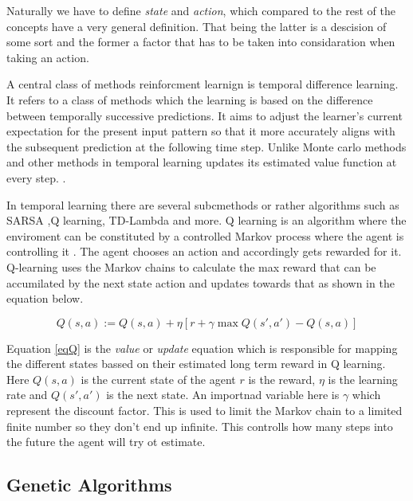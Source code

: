 Naturally we have to define \textit{state} and \textit{action}, which compared to the rest of the concepts have a very general definition. That being the latter is a descision of some sort and the former a factor that has to be taken into considaration when taking an action. 

A central class of methods reinforcment learnign is temporal difference learning. It refers to a class of methods which the learning is based on the difference between temporally successive predictions. It aims to adjust the learner's current expectation for the present input pattern so that it more accurately aligns with the subsequent prediction at the following time step. Unlike Monte carlo methods and other methods in temporal learning updates its estimated value function at every step. \cite{tesauro1995temporal}. 

In temporal learning there are several subcmethods or rather algorithms such as SARSA ,Q learning, TD-Lambda and more. Q learning is an algorithm where the enviroment can be constituted by a controlled Markov process where the agent is controlling it \cite{watkins1992q}. The agent chooses an action and accordingly gets rewarded for it. Q-learning uses the Markov chains to calculate the max reward that can be accumilated by the next state action and updates towards that as shown in the equation below.

\begin{equation} \label{eqQ}
    { Q(s,a) := Q(s,a) + \eta [r + \gamma \max Q(s',a') - Q(s,a)]}
\end{equation}

Equation \ref{eqQ} is the \textit{value} or \textit{update} equation which is responsible for mapping the different states bassed on their estimated long term reward in Q learning. Here $Q(s,a)$ is the current state of the agent $r$ is the reward, $\eta$ is the learning rate and $Q(s',a')$ is the next state. An importnad variable here is $\gamma$ which represent the discount factor. This is used to limit the Markov chain to a limited finite number so they don't end up infinite. This controlls how many steps into the future the agent will try ot estimate. 


\subsection{Genetic Algorithms}

